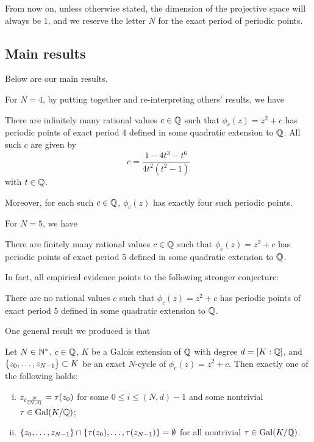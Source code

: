 From now on, unless otherwise stated, the dimension of the projective
space will always be 1, and we reserve the letter $N$ for the exact
period of periodic points.

\subsection{Main results}
\label{subsec:results}

Below are our main results.

For $N = 4$, by putting together and re-interpreting others' results,
we have

\begin{theorem}
  \label{th:n=4-infinite}
  There are infinitely many rational values $c \in \mathbb{Q}$ such that
  $\phi_c(z) = z^2 + c$ has periodic points of exact period 4 defined
  in some quadratic extension to $\mathbb{Q}$. All such $c$ are given by
  \[
  c = \frac{1 - 4t^3 - t^6}{4t^2(t^2 - 1)}
  \]
  with $t \in \mathbb{Q}$.

  Moreover, for each such $c \in \mathbb{Q}$, $\phi_c(z)$ has exactly four
  such periodic points.
\end{theorem}

For $N = 5$, we have

\begin{theorem}
  \label{th:n=5-finite}
  There are finitely many rational values $c \in \mathbb{Q}$ such that
  $\phi_c(z) = z^2 + c$ has periodic points of exact period 5 defined
  in some quadratic extension to $\mathbb{Q}$.
\end{theorem}

In fact, all empirical evidence points to the following stronger
conjecture:

\begin{conjecture}
  \label{cj:n=5-zero}
  There are no rational values $c$ such that $\phi_c(z) = z^2 + c$ has
  periodic points of exact period 5 defined in some quadratic
  extension to $\mathbb{Q}$.
\end{conjecture}

One general result we produced is that

\newcommand{\nd}{\frac{N}{(N, d)}}

\begin{theorem}
  Let $N \in \mathbb{N}^*$, $c \in \mathbb{Q}$, $K$ be a Galois extension of $\mathbb{Q}$ with
  degree $d = [K : \mathbb{Q}]$, and $\left\{z_0, \dots, z_{N-1}\right\} \subset K$ be
  an exact $N$-cycle of $\phi_c(z) = z^2 + c$. Then exactly one of the
  following holds:
  \begin{enumerate}[(i)]
  \item $z_{i\nd} = \t(z_0)$ for some $0 \le i \le (N, d)-1$ and some
    nontrivial $\tau \in \mathrm{Gal}(K/\mathbb{Q})$;

  \item $\left\{z_0, \dots, z_{N-1}\right\} \cap \left\{\tau(z_0), \dots,
      \tau(z_{N-1})\right\} = \emptyset$ for all nontrivial $\tau \in \mathrm{Gal}(K/\mathbb{Q})$.
  \end{enumerate}
\end{theorem}

